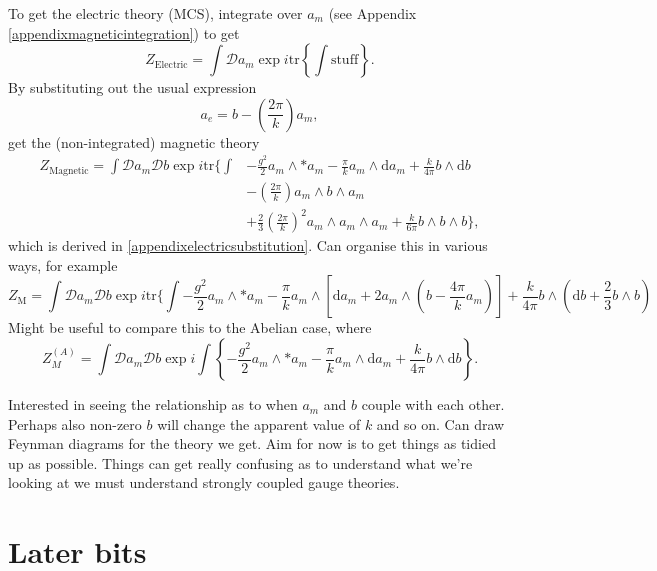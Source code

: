 \documentclass{article}
\begin{document}
To get the electric theory (MCS), integrate over $a_{m}$ (see Appendix \ref{appendixmagneticintegration}) to get
\begin{equation}
    Z_{\text{Electric}} = \int \mathcal{D}a_{m}\exp i \text{tr}\left\{\int \text{stuff}\right\}.
\end{equation}
By substituting out the usual expression
\begin{equation}
    a_{e} = b - \left(\frac{2\pi}{k} \right)a_{m}, 
\end{equation}
get the (non-integrated) magnetic theory
\begin{align}
    Z_{\text{Magnetic}} = \int \mathcal{D}a_{m}\mathcal{D}b \exp i \text{tr}\bigg\{\int &-\frac{g^{2}}{2}a_{m}\wedge *a_{m} - \frac{\pi}{k}a_{m}\wedge \mathrm{d}a_{m} + \frac{k}{4\pi}b\wedge \mathrm{d}b \nonumber\\
    &- \left(\frac{2\pi}{k}\right)a_{m}\wedge b \wedge a_{m}\nonumber\\
    &+ \frac{2}{3}\left(\frac{2\pi}{k}\right)^{2}a_{m}\wedge a_{m}\wedge a_{m}+ \frac{k}{6\pi}b\wedge b \wedge b\bigg\},
\end{align}
which is derived in \ref{appendixelectricsubstitution}. Can organise this in various ways, for example
\begin{equation}
    \boxed{
    Z_{\text{M}} = \int \mathcal{D}a_{m}\mathcal{D}b\exp i \text{tr}\bigg\{\int -\frac{g^{2}}{2}a_{m}\wedge *a_{m} - \frac{\pi}{k}a_{m}\wedge \left[\mathrm{d}a_{m}+2a_{m}\wedge \left(b - \frac{4\pi}{k}a_{m}\right)\right] + \frac{k}{4\pi}b\wedge \left(\mathrm{d}b + \frac{2}{3}b\wedge b\right)
    }
\end{equation}
Might be useful to compare this to the Abelian case, where
\begin{equation}
    Z_{M}^{(A)} = \int \mathcal{D}a_{m}\mathcal{D}b \exp i \int \left\{-\frac{g^{2}}{2}a_{m}\wedge *a_{m} - \frac{\pi}{k}a_{m}\wedge \mathrm{d}a_{m} + \frac{k}{4\pi}b\wedge \mathrm{d}b\right\}.
\end{equation}

Interested in seeing the relationship as to when $a_{m}$ and $b$ couple with each other. Perhaps also non-zero $b$ will change the apparent value of $k$ and so on. Can draw Feynman diagrams for the theory we get. Aim for now is to get things as tidied up as possible. Things can get really confusing as to understand what we're looking at we must understand strongly coupled gauge theories. 




\section{Later bits}
\end{document}
